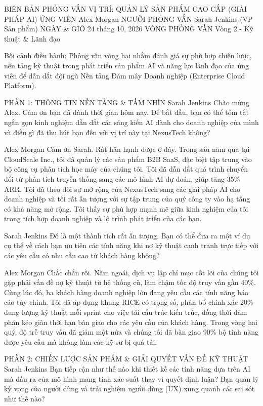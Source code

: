 BIÊN BẢN PHỎNG VẤN
VỊ TRÍ: QUẢN LÝ SẢN PHẨM CAO CẤP (GIẢI PHÁP AI)
ỨNG VIÊN
Alex Morgan
NGƯỜI PHỎNG VẤN
Sarah Jenkins (VP Sản phẩm)
NGÀY \& GIỜ
24 tháng 10, 2026
VÒNG PHỎNG VẤN
Vòng 2 - Kỹ thuật \& Lãnh đạo

Bối cảnh điều hành: Phỏng vấn vòng hai nhằm đánh giá sự phù hợp chiến lược, nền tảng kỹ thuật trong phát triển sản phẩm AI và năng lực lãnh đạo của ứng viên để dẫn dắt đội ngũ Nền tảng Đám mây Doanh nghiệp (Enterprise Cloud Platform).

PHẦN 1: THÔNG TIN NỀN TẢNG \& TẦM NHÌN
Sarah Jenkins
Chào mừng Alex. Cảm ơn bạn đã dành thời gian hôm nay. Để bắt đầu, bạn có thể tóm tắt ngắn gọn kinh nghiệm dẫn dắt các sáng kiến AI dành cho doanh nghiệp của mình và điều gì đã thu hút bạn đến với vị trí này tại NexusTech không?

Alex Morgan
Cảm ơn Sarah. Rất hân hạnh được ở đây. Trong sáu năm qua tại CloudScale Inc., tôi đã quản lý các sản phẩm B2B SaaS, đặc biệt tập trung vào bộ công cụ phân tích học máy của chúng tôi. Tôi đã dẫn dắt quá trình chuyển đổi từ phân tích truyền thống sang các mô hình AI dự đoán, giúp tăng 35\% ARR. Tôi đã theo dõi sự mở rộng của NexusTech sang các giải pháp AI cho doanh nghiệp và tôi rất ấn tượng với sự tập trung của quý công ty vào hạ tầng có khả năng mở rộng. Tôi thấy sự phù hợp mạnh mẽ giữa kinh nghiệm của tôi trong tích hợp doanh nghiệp và lộ trình phát triển của các bạn.

Sarah Jenkins
Đó là một thành tích rất ấn tượng. Bạn có thể đưa ra một ví dụ cụ thể về cách bạn ưu tiên các tính năng khi nợ kỹ thuật cạnh tranh trực tiếp với các yêu cầu có nhu cầu cao từ khách hàng không?

Alex Morgan
Chắc chắn rồi. Năm ngoái, dịch vụ lập chỉ mục cốt lõi của chúng tôi gặp phải vấn đề nợ kỹ thuật từ hệ thống cũ, làm chậm tốc độ truy vấn gần 40\%. Cùng lúc đó, ba khách hàng doanh nghiệp lớn đang yêu cầu các tính năng báo cáo tùy chỉnh. Tôi đã áp dụng khung RICE có trọng số, phân bổ chính xác 20\% dung lượng kỹ thuật mỗi sprint cho việc tái cấu trúc kiến trúc, đồng thời đàm phán kéo giãn thời hạn bàn giao cho các yêu cầu của khách hàng. Trong vòng hai quý, độ trễ truy vấn đã giảm một nửa và chúng tôi đã bàn giao 90\% bộ tính năng được yêu cầu mà không làm các kỹ sư bị quá tải.

PHẦN 2: CHIẾN LƯỢC SẢN PHẨM \& GIẢI QUYẾT VẤN ĐỀ KỸ THUẬT
Sarah Jenkins
Bạn tiếp cận như thế nào khi thiết kế các tính năng dựa trên AI mà đầu ra của mô hình mang tính xác suất thay vì quyết định luận? Bạn quản lý kỳ vọng của người dùng và trải nghiệm người dùng (UX) xung quanh các sai sót như thế nào?

